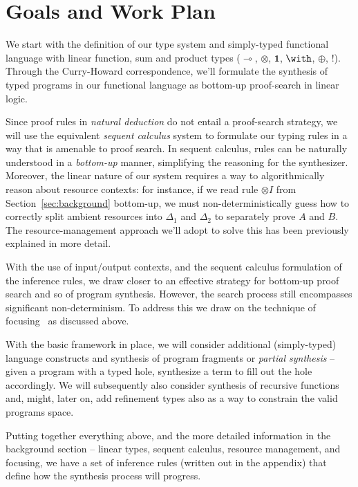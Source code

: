 \documentclass{llncs}
\newcommand{\lolli}{\multimap}
\newcommand{\tensor}{\otimes}
\newcommand{\one}{\mathbf{1}}
\newcommand{\bang}{{!}}
\begin{document}
\section{Goals and Work Plan}

We start with the definition of our type system and simply-typed
functional language with linear function, sum and product types
($\lolli$, $\tensor$, $\one$, $\with$, $\oplus$, $\bang$).  Through
the Curry-Howard correspondence, we'll formulate the synthesis of
typed programs in our functional language as bottom-up proof-search in
linear logic.

Since proof rules in \emph{natural deduction} do not entail a
proof-search strategy, we will use the equivalent \emph{sequent
calculus} system to formulate our typing rules in a way that is
amenable to proof search.
%
In sequent calculus, rules can be naturally understood in a
\emph{bottom-up} manner, simplifying the reasoning for the
synthesizer. Moreover, the linear nature of our system requires a way
to algorithmically reason about resource contexts: for instance, if we
read rule $\tensor I$ from Section~\ref{sec:background} bottom-up, we
must non-deterministically guess how to correctly split ambient
resources into $\Delta_1$ and $\Delta_2$ to separately prove $A$ and
$B$. The resource-management approach we'll adopt to solve this has been 
previously explained in more detail.

With the use of input/output contexts, and the sequent calculus
formulation of the inference rules, we draw closer to an effective
strategy for bottom-up proof search and so of program synthesis.
%
%
However, the search process still encompasses significant
non-determinism. To address this we draw on the technique of
focusing~\cite{10.1093/logcom/2.3.297,DBLP:conf/cade/ChaudhuriP05} as
discussed above.

With the basic framework in place, we will consider additional
(simply-typed) language constructs and synthesis of program fragments
or \emph{partial synthesis} -- given a program with a typed hole,
synthesize a term to fill out the hole accordingly. We will
subsequently also consider synthesis of recursive functions and,
might, later on, add refinement types also as a way to constrain the
valid programs space.

Putting together everything above, and the more detailed information
in the background section -- linear types, sequent calculus, resource
management, and focusing, we have a set of inference rules (written
out in the appendix) that define how the synthesis process will
progress.
\end{document}
